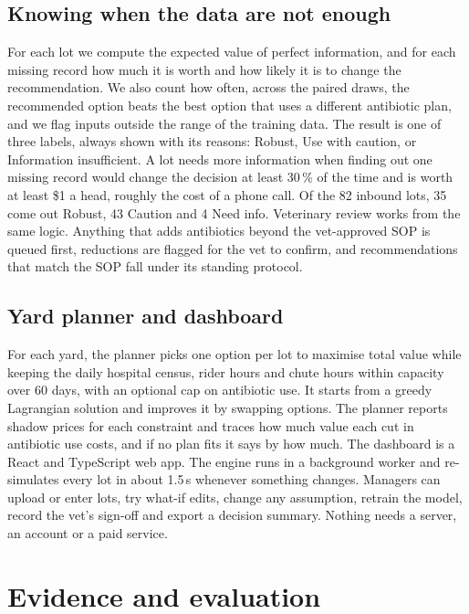 \documentclass[10pt,letterpaper]{article}
\newcommand{\pct}{\,\%}
\newcommand{\usd}[1]{\$#1}
\begin{document}
\subsection{Knowing when the data are not enough}
For each lot we compute the expected value of perfect information, and for each missing record how much it is worth and how likely it is to change the recommendation. We also count how often, across the paired draws, the recommended option beats the best option that uses a different antibiotic plan, and we flag inputs outside the range of the training data. The result is one of three labels, always shown with its reasons: Robust, Use with caution, or Information insufficient. A lot needs more information when finding out one missing record would change the decision at least 30\pct{} of the time and is worth at least \usd{1} a head, roughly the cost of a phone call. Of the 82 inbound lots, 35 come out Robust, 43 Caution and 4 Need info. Veterinary review works from the same logic. Anything that adds antibiotics beyond the vet-approved SOP is queued first, reductions are flagged for the vet to confirm, and recommendations that match the SOP fall under its standing protocol.

\subsection{Yard planner and dashboard}
For each yard, the planner picks one option per lot to maximise total value while keeping the daily hospital census, rider hours and chute hours within capacity over 60 days, with an optional cap on antibiotic use. It starts from a greedy Lagrangian solution and improves it by swapping options. The planner reports shadow prices for each constraint and traces how much value each cut in antibiotic use costs, and if no plan fits it says by how much. The dashboard is a React and TypeScript web app. The engine runs in a background worker and re-simulates every lot in about 1.5\,s whenever something changes. Managers can upload or enter lots, try what-if edits, change any assumption, retrain the model, record the vet's sign-off and export a decision summary. Nothing needs a server, an account or a paid service.

\section{Evidence and evaluation}
\end{document}
